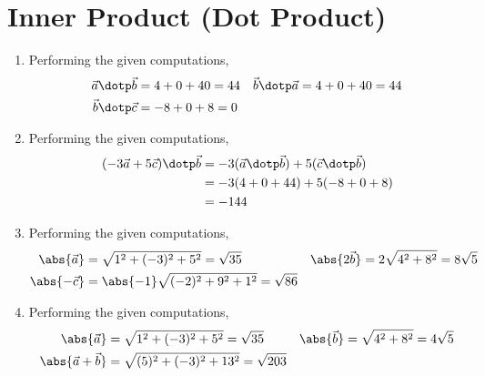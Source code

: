 \section{Inner Product (Dot Product)}
\begin{enumerate}
      \item Performing the given computations,
            \begin{align}
                  \vec{a} \dotp \vec{b} & = 4 + 0 + 40 = 44 &
                  \vec{b} \dotp \vec{a} & = 4 + 0 + 40 = 44   \\
                  \vec{b} \dotp \vec{c} & = -8 + 0 + 8 = 0
            \end{align}

      \item Performing the given computations,
            \begin{align}
                  (-3\vec{a} + 5\vec{c}) \dotp \vec{b} & = -3 (\vec{a} \dotp \vec{b})
                  + 5 (\vec{c} \dotp \vec{b})                                         \\
                                                       & = -3 (4 + 0 + 44)
                  + 5 (-8 + 0 + 8)                                                    \\
                                                       & = -144
            \end{align}

      \item Performing the given computations,
            \begin{align}
                  \abs{\vec{a}}  & = \sqrt{1^2 + (-3)^2 + 5^2} = \sqrt{35}         &
                  \abs{2\vec{b}} & = 2\sqrt{4^2 + 8^2} = 8\sqrt{5}                   \\
                  \abs{-\vec{c}} & = \abs{-1}\sqrt{(-2)^2 + 9^2 + 1^2} = \sqrt{86}
            \end{align}

      \item Performing the given computations,
            \begin{align}
                  \abs{\vec{a}}           & = \sqrt{1^2 + (-3)^2 + 5^2} = \sqrt{35} &
                  \abs{\vec{b}}           & = \sqrt{4^2 + 8^2} = 4\sqrt{5}            \\
                  \abs{\vec{a} + \vec{b}} &
                  = \sqrt{(5)^2 + (-3)^2 + 13^2} = \sqrt{203}
            \end{align}


\end{enumerate}
